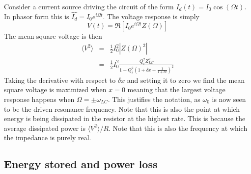 \documentclass{article}
\begin{document}
Consider a current source driving the circuit of the form $I_d(t) = I_0\cos(\Omega t)$. In phasor form this is $\hat{I_d} = I_0e^{i\Omega t}$. The voltage response is simply \begin{equation}
V(t) = \Re \left[ I_0 e^{i\Omega t}Z(\Omega) \right] \end{equation}
The mean square voltage is then \begin{eqnarray}
\langle V^2 \rangle &=& \frac{1}{2} I_0^2 |Z(\Omega)^2| \\
&=& \frac{1}{2} I_0^2 \frac{Q_i^2 Z_{LC}^2}{1+Q_i^2 \left( 1+\delta x - \frac{1}{1+\delta x} \right)^2} \end{eqnarray}
Taking the derivative with respect to $\delta x$ and setting it to zero we find the mean square voltage is maximized when $x=0$ meaning that the largest voltage response happens when $\Omega = \pm \omega_{LC}$. This justifies the notation, as $\omega_0$ is now seen to be the driven resonance frequency. Note that this is also the point at which energy is being dissipated in the resistor at the highest rate. This is because the average dissipated power is $\langle V^2 \rangle/R$. Note that this is also the frequency at which the impedance is purely real.

\subsection{Energy stored and power loss}
\end{document}
